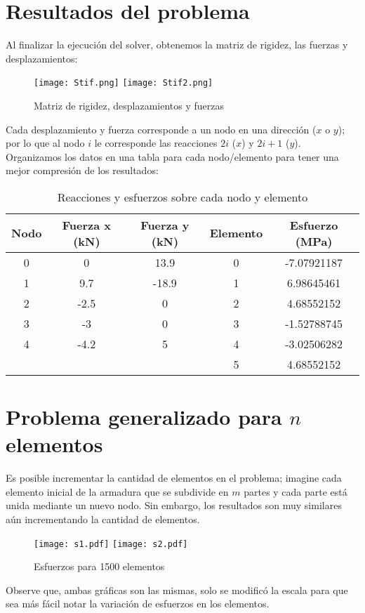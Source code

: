 \documentclass[12pt,a4paper]{article}
\begin{document}
\section{Resultados del problema}
Al finalizar la ejecución del solver, obtenemos la matriz de rigidez, las fuerzas y desplazamientos:
\begin{figure}[H]
    \centering
    \texttt{[image: Stif.png]}
    \texttt{[image: Stif2.png]}
    \caption{Matriz de rigidez, desplazamientos y fuerzas}
\end{figure}
Cada desplazamiento y fuerza corresponde a un nodo en una dirección ($x$ o $y$); por lo que al nodo $i$ le corresponde las reacciones $2i$ ($x$) y $2i+1$ ($y$).\\
Organizamos los datos en una tabla para cada nodo/elemento para tener una mejor compresión de los resultados:
\begin{table}[H]
    \centering
    \begin{tabular}{|c|c|c||c|c|}
        \hline
        Nodo & Fuerza x (kN) & Fuerza y (kN) & Elemento & Esfuerzo (MPa) \\
        \hline
        0 & 0 & 13.9 & 0 & -7.07921187\\
        \hline
        1 & 9.7 & -18.9 & 1 & 6.98645461\\
        \hline
        2 & -2.5 & 0 & 2 & 4.68552152\\
        \hline
        3 & -3 & 0 & 3 & -1.52788745\\
        \hline
        4 & -4.2 & 5 & 4 & -3.02506282\\
        \hline
         &  &  & 5 & 4.68552152\\
        \hline
    \end{tabular}
    \caption{Reacciones y esfuerzos sobre cada nodo y elemento}
\end{table}
\section{Problema generalizado para $n$ elementos}
Es posible incrementar la cantidad de elementos en el problema; imagine cada elemento inicial de la armadura que se subdivide en $m$ partes y cada parte está unida mediante un nuevo nodo. Sin embargo, los resultados son muy similares aún incrementando la cantidad de elementos.
\begin{figure}[H]
    \centering
    \texttt{[image: s1.pdf]}
    \texttt{[image: s2.pdf]}
    \caption{Esfuerzos para 1500 elementos}
\end{figure}
Observe que, ambas gráficas son las mismas, solo se modificó la escala para que sea más fácil notar la variación de esfuerzos en los elementos.
\end{document}
